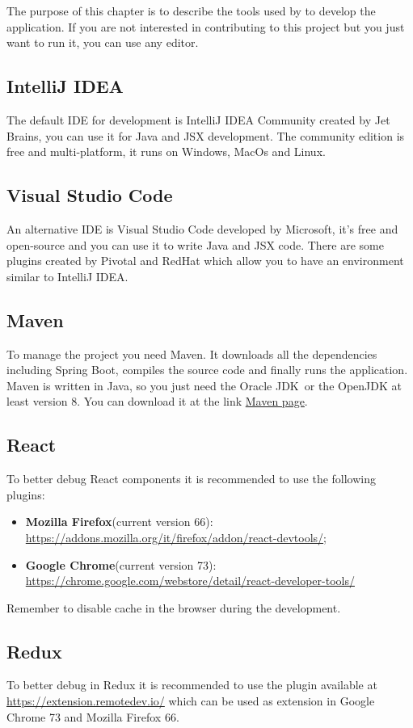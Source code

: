 The purpose of this chapter is to describe the tools used by \gruppo{} to develop the application.
If you are not interested in contributing to this project but you just want to run it, you can use any editor.
\subsection{IntelliJ IDEA}
The default IDE for development is IntelliJ IDEA Community created by Jet Brains, you can use it for Java and JSX development. The community edition is free and multi-platform, it runs on Windows, MacOs and Linux.

\subsection{Visual Studio Code}
An alternative IDE is Visual Studio Code developed by Microsoft, it's free and open-source and you can use it to write Java and JSX code. There are some plugins created by Pivotal and RedHat which allow you to have an environment similar to IntelliJ IDEA.

\subsection{Maven}
To manage the project you need Maven. It downloads all the dependencies including Spring Boot, compiles the source code and finally runs the application. Maven is written in Java, so you just need the {Oracle JDK}\ or the OpenJDK at least version 8.
You can download it at the link \href{https://maven.apache.org/}{Maven page}.

\subsection{React}
To better debug React components it is recommended to use the following plugins:
\begin{itemize}
\item \textbf{Mozilla Firefox}(current version 66): \\
\url{https://addons.mozilla.org/it/firefox/addon/react-devtools/};
\item \textbf{Google Chrome}(current version 73): \\
\href{https://chrome.google.com/webstore/detail/react-developer-tools/fmkadmapgofadopljbjfkapdkoienihi}{https://chrome.google.com/webstore/detail/react-developer-tools/}
\end{itemize}
Remember to disable cache in the browser during the development.

\subsection{Redux}
To better debug in Redux it is recommended to use the plugin available at\\ \url{https://extension.remotedev.io/} which can be used as extension in Google Chrome 73 and Mozilla Firefox 66.

 
